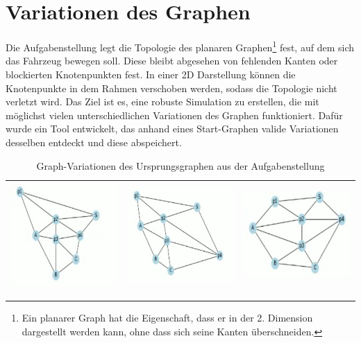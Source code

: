 \newpage
\section{Variationen des Graphen}
Die Aufgabenstellung legt die Topologie des planaren Graphen\footnote{Ein planarer Graph hat die Eigenschaft, dass er in der 2. Dimension dargestellt werden kann, ohne dass sich seine Kanten überschneiden.} fest, auf dem sich das Fahrzeug bewegen soll. Diese bleibt abgesehen von fehlenden Kanten oder blockierten Knotenpunkten fest. In einer 2D Darstellung können die Knotenpunkte in dem Rahmen verschoben werden, sodass die Topologie nicht verletzt wird. Das Ziel ist es, eine robuste Simulation zu erstellen, die mit möglichst vielen unterschiedlichen Variationen des Graphen funktioniert. Dafür wurde ein Tool entwickelt, das anhand eines Start-Graphen valide Variationen desselben entdeckt und diese abspeichert. 

\begin{table}[h!]
    \centering
    \begin{tabular}{|c|c|c|}
        \hline
        \includegraphics[width=5cm]{img/graphmorph/graph_morph1.png} & 
        \includegraphics[width=5cm]{img/graphmorph/graph_morph2.png} & 
        \includegraphics[width=5cm]{img/graphmorph/graph_morph3.png} \\
        \hline
    \end{tabular}
    \caption{Graph-Variationen des Ursprungsgraphen aus der Aufgabenstellung}
\end{table}

